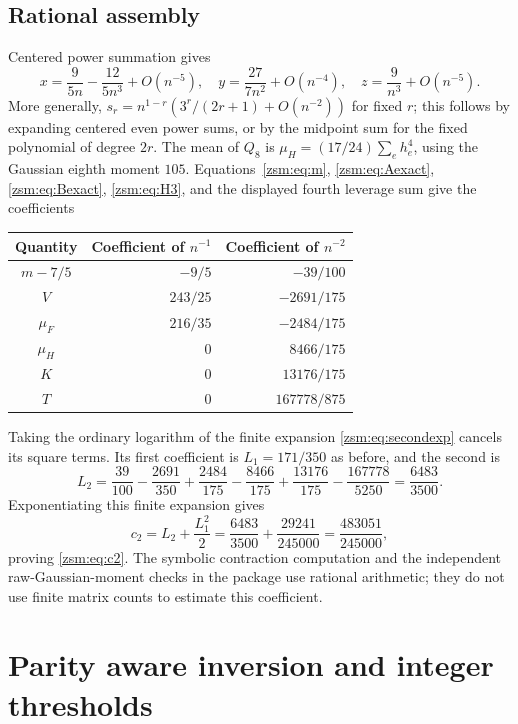 \documentclass[11pt]{article}
\theoremstyle{definition}\newtheorem{definition}[theorem]{Definition}
\theoremstyle{remark}\newtheorem{remark}[theorem]{Remark}
\begin{document}
\subsection{Rational assembly}
Centered power summation gives
\[
 x=\frac9{5n}-\frac{12}{5n^3}+O(n^{-5}),\quad
 y=\frac{27}{7n^2}+O(n^{-4}),\quad z=\frac9{n^3}+O(n^{-5}).
\]
More generally, $s_r=n^{1-r}(3^r/(2r+1)+O(n^{-2}))$ for fixed $r$; this
follows by expanding centered even power sums, or by the midpoint sum for the
fixed polynomial of degree $2r$. The mean of $Q_8$ is
$\mu_H=(17/24)\sum_eh_e^4$, using the Gaussian eighth moment $105$.
Equations~\eqref{zsm:eq:m}, \eqref{zsm:eq:Aexact}, \eqref{zsm:eq:Bexact},
\eqref{zsm:eq:H3}, and the displayed fourth leverage sum give the coefficients
\begin{center}
\begin{tabular}{crr}
\toprule
Quantity&Coefficient of $n^{-1}$&Coefficient of $n^{-2}$\\
\midrule
$m-7/5$&$-9/5$&$-39/100$\\
$V$&$243/25$&$-2691/175$\\
$\mu_F$&$216/35$&$-2484/175$\\
$\mu_H$&$0$&$8466/175$\\
$K$&$0$&$13176/175$\\
$T$&$0$&$167778/875$\\
\bottomrule
\end{tabular}
\end{center}
Taking the ordinary logarithm of the finite expansion
\eqref{zsm:eq:secondexp} cancels its square terms. Its first coefficient is
$L_1=171/350$ as before, and the second is
\[
 L_2=\frac{39}{100}-\frac{2691}{350}+\frac{2484}{175}
       -\frac{8466}{175}+\frac{13176}{175}-\frac{167778}{5250}
     =\frac{6483}{3500}.
\]
Exponentiating this finite expansion gives
\[
 c_2=L_2+\frac{L_1^2}2
     =\frac{6483}{3500}+\frac{29241}{245000}
     =\frac{483051}{245000},
\]
proving \eqref{zsm:eq:c2}. The symbolic contraction computation and the independent
raw-Gaussian-moment checks in the package use rational arithmetic; they do not
use finite matrix counts to estimate this coefficient.

\section{Parity aware inversion and integer thresholds}\label{zsm:sec:inverse}
\end{document}
